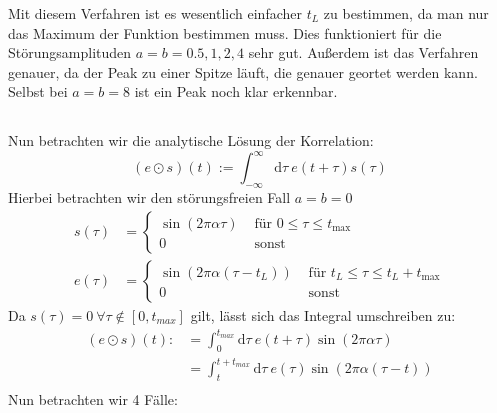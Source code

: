 \documentclass[ngerman]{scrartcl}
\begin{document}
Mit diesem Verfahren ist es wesentlich einfacher $t_L$ zu bestimmen,
da man nur das Maximum der Funktion bestimmen muss.
Dies funktioniert für die Störungsamplituden $a=b=0.5,1,2,4$ sehr gut.
Außerdem ist das Verfahren genauer, da der Peak zu einer Spitze l\"auft,
die genauer geortet werden kann.
Selbst bei $a=b=8$ ist ein Peak noch klar erkennbar. 
\newpage
\subsection{}
Nun betrachten wir die analytische L\"osung der Korrelation:
\begin{equation*}
	(e \odot s)(t):=\int_{-\infty}^{\infty} \mathrm{d} \tau~ e(t+\tau) s(\tau)
\end{equation*}
Hierbei betrachten wir den st\"orungsfreien Fall $a=b=0$
\begin{align*}
	s(\tau)&=\left\{\begin{array}{ll}
		\sin (2 \pi \alpha \tau) & \text { für } 0 \leq \tau \leq t_{\max } \\
		0 & \text { sonst }
		\end{array}\right.\\
	e(\tau)&=\left\{\begin{array}{ll}
	\sin (2 \pi \alpha (\tau-t_L)) & \text { für } t_L \leq \tau \leq t_L+t_{\max } \\
	0 & \text { sonst }
	\end{array}\right.
\end{align*}
Da  $s(\tau)=0~\forall\tau\notin[0,t_{max}]$ gilt, l\"asst sich das Integral umschreiben zu:
\begin{align*}
	(e \odot s)(t):&=\int_{0}^{t_{max}} \mathrm{d} \tau~ e(t+\tau) \sin(2\pi\alpha\tau)\\
	&=\int_{t}^{t+t_{max}} \mathrm{d} \tau~ e(\tau) \sin(2\pi\alpha(\tau-t))\\
\end{align*}
Nun betrachten wir 4 F\"alle:
\end{document}
